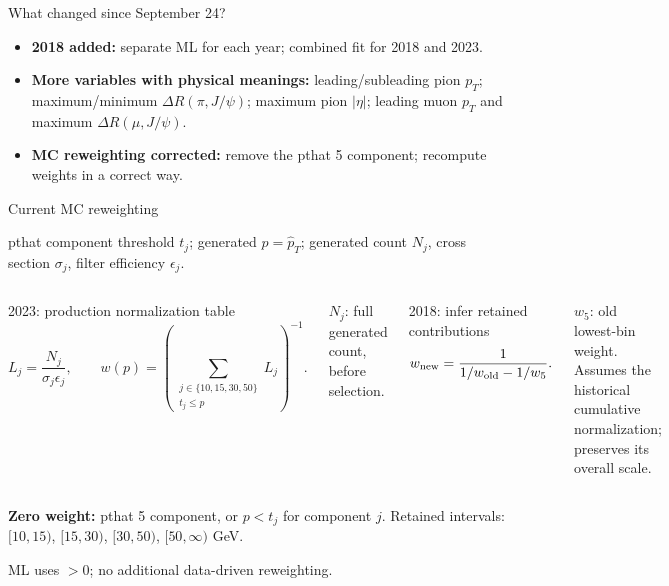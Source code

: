 \begin{frame}[plain,label=sep_title]\titlepage\end{frame}
\begin{frame}[label=sep_changes]{What changed since September 24?}
\begin{itemize}
\item \textbf{2018 added:} separate ML for each year; combined fit for 2018 and 2023.
\item \textbf{More variables with physical meanings:} leading/subleading pion $p_T$; maximum/minimum $\Delta R(\pi,J/\psi)$; maximum pion $|\eta|$; leading muon $p_T$ and maximum $\Delta R(\mu,J/\psi)$.
\item \textbf{MC reweighting corrected:} remove the pthat 5 component; recompute weights in a correct way.
\end{itemize}
\end{frame}

\begin{frame}[label=sep_weights]{Current MC reweighting}

\small
pthat component threshold $t_j$; generated $p=\hat p_T$; generated count $N_j$, cross section $\sigma_j$, filter efficiency $\epsilon_j$.
\begin{columns}[T]
\begin{block}{2023: production normalization table}
\[L_j=\frac{N_j}{\sigma_j\epsilon_j},\qquad
w(p)=\left(\sum_{\substack{j\in\{10,15,30,50\}\\t_j\leq p}}L_j\right)^{-1}.\]
\end{block}
$N_j$: full generated count, before selection.
\begin{block}{2018: infer retained contributions}
\[w_{\rm new}=\frac{1}{1/w_{\rm old}-1/w_5}.\]
\end{block}
$w_5$: old lowest-bin weight. Assumes the historical cumulative normalization; preserves its overall scale.
\end{columns}
\medskip
\textbf{Zero weight:} pthat 5 component, or $p<t_j$ for component $j$. Retained intervals: $[10,15)$, $[15,30)$, $[30,50)$, $[50,\infty)$ GeV.\par
\medskip
ML uses $>0$; no additional data-driven reweighting.

\end{frame}

